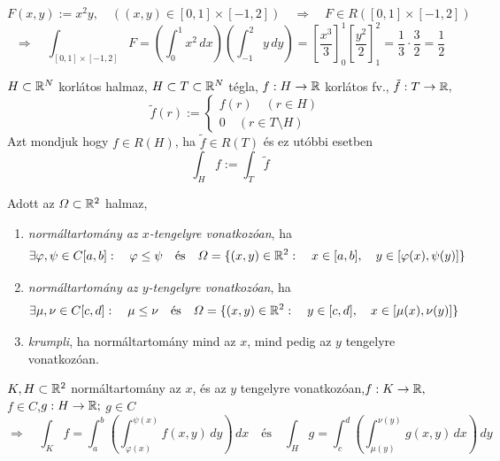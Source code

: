 \documentclass[a4paper,11.5pt]{article}
\begin{document}
	\begin{example}
		$F(x,y):=x^2y,\quad ((x,y)\in[0,1]\times[-1,2])\quad \Rightarrow\quad F\in R([0,1]\times[-1,2])$
		\[ \Rightarrow\quad \int_{[0,1]\times[-1,2]}F=\left(\int_{0}^{1}x^2\,dx\right)\left(\int_{-1}^{2}y\,dy\right)=\left[\frac{x^3}{3}\right]_0^1 \left[\frac{y^2}{2}\right]_1^2=\frac{1}{3}\cdot\frac{3}{2}=\frac{1}{2} \]
	\end{example}
	\begin{definition}
		$H\subset\mathbb{R}^N$ korlátos halmaz, $H\subset T\subset\mathbb{R}^N$ tégla, $f:H\to\mathbb{R}$ korlátos fv., $\tilde{f}:T\to\mathbb{R},$
		\[ \quad \tilde{f}(r):=\begin{cases}
			f(r)\quad (r\in H)\\
			0\quad (r\in T\setminus H)
		\end{cases} \]
		Azt mondjuk hogy $f\in R(H)$, ha $\tilde{f}\in R(T)$ és ez utóbbi esetben 
		\[ \int_Hf:=\int_T\tilde{f} \]
	\end{definition}
	\begin{definition}
		Adott az $\varOmega\subset \mathbb{R}^2$ halmaz,
		\begin{enumerate}
			\item \emph{normáltartomány az $x$-tengelyre vonatkozóan}, ha
			\[ \exists\varphi,\psi \in C[a,b]:\quad \varphi\leq\psi \quad \text{és}\quad \varOmega=\{(x,y)\in\mathbb{R}^2:\quad x\in[a,b],\quad y\in[\varphi(x),\psi (y)] \}\]
			\item \emph{normáltartomány az $y$-tengelyre vonatkozóan}, ha
			\[ \exists\mu,\nu\in C[c,d]:\quad \mu\leq\nu\quad \text{és}\quad \varOmega=\{(x,y)\in\mathbb{R}^2:\quad y\in[c,d],\quad x\in[\mu(x),\nu(y)] \}\]
			\item \emph{krumpli}, ha normáltartomány mind az $x$, mind pedig az $y$ tengelyre vonatkozóan.
		\end{enumerate}
	\end{definition}
	\begin{theorem}
		$K,H\subset\mathbb{R}^2$ normáltartomány az $x$, és az $y$ tengelyre vonatkozóan,\quad $f:K\to\mathbb{R},$ $f\in C$,\quad $g:H\to \mathbb{R};$ $g\in C$
		\[ \Rightarrow\quad \int_K f=\int_{a}^{b}\left(\int_{\varphi(x)}^{\psi (x)}f(x,y)\,dy\right)\,dx\quad \text{és}\quad \int_Hg=\int_{c}^{d}\left(\int_{\mu(y)}^{\nu(y)}g(x,y)\,dx\right)\,dy \]
	\end{theorem}
\end{document}
